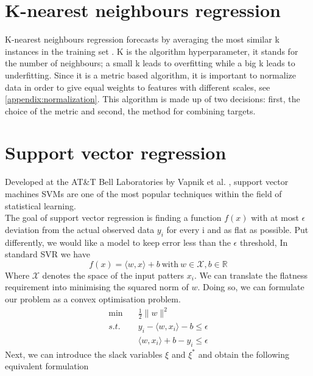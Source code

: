 \section{K-nearest neighbours regression}
K-nearest neighbours regression forecasts by averaging the most similar k instances in the training set \cite{macqueen1967some}. K is the algorithm hyperparameter, it stands for the number of neighbours; a small k leads to overfitting while a big k leads to underfitting. 
Since it is a metric based algorithm, it is important to normalize data in order to give equal weights to features with different scales, see \ref{appendix:normalization}.
This algorithm is made up of two decisions: first, the choice of the metric and second, the method for combining targets.


\section{Support vector regression}
Developed at the AT\&T Bell Laboratories by Vapnik et al. \cite{cortes1995support} \cite{vapnik1997support}, support vector machines SVMs are one of the most popular techniques within the field of statistical learning.
\\
The goal of support vector regression is finding a function $f(x)$ with at most $\epsilon$ deviation from the actual observed data $y_i$ for every i and as flat as possible. 
Put differently, we would like a model to keep error less than the $\epsilon$ threshold,  
In standard SVR we have
\begin{equation}
    f(x)=\langle w,x \rangle +b \ \textrm{with} \ w \in \mathcal{X}, b \in \mathbb{R}
\end{equation}
Where $\mathcal{X}$ denotes the space of the input patters $x_i$.
We can translate the flatness requirement into minimising the squared norm of $w$. Doing so, we can formulate our problem as a convex optimisation problem.
\begin{equation}
    \begin{aligned}
        \min \quad& \frac{1}{2}\|w\|^2
        \\
        s.t. \quad& y_i-\langle w, x_i\rangle-b\leq \epsilon
        \\
        \quad& \langle w, x_i\rangle +b-y_i\leq \epsilon
    \end{aligned}
\end{equation}
Next, we can introduce the slack variables $\xi$ and $\xi^*$ and obtain the following equivalent formulation
